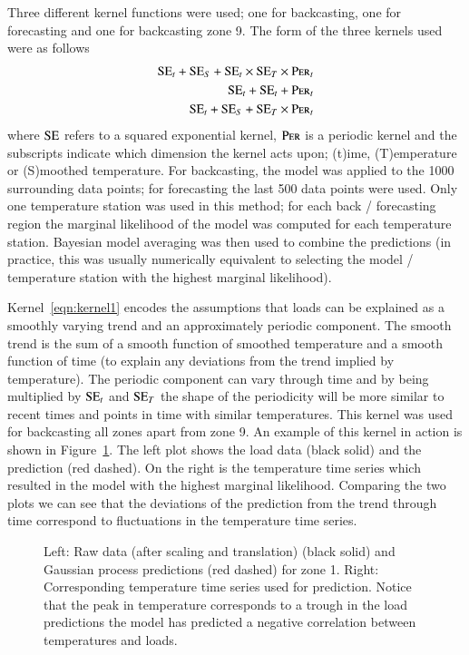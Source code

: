 \documentclass[final,authoryear,1p,times]{elsarticle}
\newcommand{\acro}[1]{\textsc{#1}}
\def\SE{\acro{SE}}
\def\Per{\acro{Per}}
\begin{document}
Three different kernel functions were used; one for backcasting, one for forecasting and one for backcasting zone 9.
The form of the three kernels used were as follows\footnotemark
{}
\begin{eqnarray}
\SE_t + \SE_S + \SE_t \times \SE_T \times \Per_t \label{eqn:kernel1}\\
\SE_t + \SE_t + \Per_t \label{eqn:kernel2}\\
\SE_t + \SE_S + \SE_T \times \Per_t\label{eqn:kernel3}
\end{eqnarray}
where $\SE$ refers to a squared exponential kernel, $\Per$ is a periodic kernel and the subscripts indicate which dimension the kernel acts upon; (t)ime, (T)emperature or (S)moothed temperature.
For backcasting, the model was applied to the 1000 surrounding data points; for forecasting the last 500 data points were used.
Only one temperature station was used in this method; for each back / forecasting region the marginal likelihood of the model was computed for each temperature station.
Bayesian model averaging \citep[e.g.][]{Hoeting1999} was then used to combine the predictions (in practice, this was usually numerically equivalent to selecting the model / temperature station with the highest marginal likelihood).

Kernel~\eqref{eqn:kernel1} encodes the assumptions that loads can be explained as a smoothly varying trend and an approximately periodic component.
The smooth trend is the sum of a smooth function of smoothed temperature and a smooth function of time (to explain any deviations from the trend implied by temperature).
The periodic component can vary through time and by being multiplied by $\SE_t$ and $\SE_T$ the shape of the periodicity will be more similar to recent times and points in time with similar temperatures.
This kernel was used for backcasting all zones apart from zone 9.
An example of this kernel in action is shown in Figure~\ref{fig:load_pred}.
The left plot shows the load data (black solid) and the prediction (red dashed).
On the right is the temperature time series which resulted in the model with the highest marginal likelihood.
Comparing the two plots we can see that the deviations of the prediction from the trend through time correspond to fluctuations in the temperature time series.

\begin{figure}[ht]
  \begin{center}
    
  \end{center}
  \caption{Left: Raw data (after scaling and translation) (black solid) and Gaussian process predictions (red dashed) for zone 1. Right: Corresponding temperature time series used for prediction. Notice that the peak in temperature corresponds to a trough in the load predictions \ie the model has predicted a negative correlation between temperatures and loads.}
  \label{fig:load_pred}
\end{figure}
\end{document}
